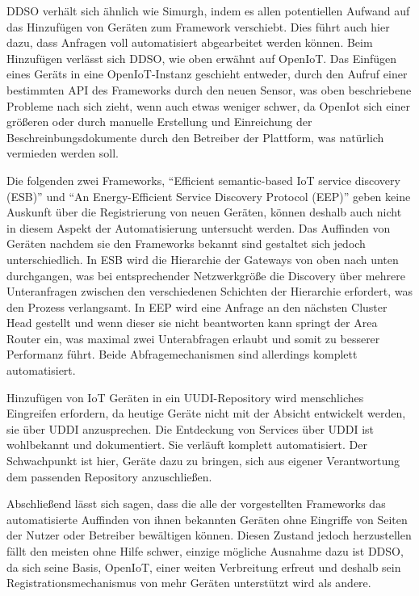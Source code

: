 \documentclass[conference,compsoc]{IEEEtran}
\begin{document}
DDSO verhält sich ähnlich wie Simurgh, indem es allen potentiellen Aufwand auf das Hinzufügen von Geräten zum Framework verschiebt. Dies führt auch hier dazu, dass Anfragen voll automatisiert abgearbeitet werden können. Beim Hinzufügen verlässt sich DDSO, wie oben erwähnt auf OpenIoT. Das Einfügen eines Geräts in eine OpenIoT-Instanz geschieht entweder, durch den Aufruf einer bestimmten API des Frameworks durch den neuen Sensor, was oben beschriebene Probleme nach sich zieht, wenn auch etwas weniger schwer, da OpenIot sich einer größeren  oder durch manuelle Erstellung und Einreichung der Beschreinbungsdokumente durch den Betreiber der Plattform, was natürlich vermieden werden soll.

Die folgenden zwei Frameworks, \enquote{Efficient semantic-based IoT service discovery (ESB)} und \enquote{An Energy-Efficient Service Discovery Protocol (EEP)} geben keine Auskunft über die Registrierung von neuen Geräten, können deshalb auch nicht in diesem Aspekt der Automatisierung untersucht werden. Das Auffinden von Geräten nachdem sie den Frameworks bekannt sind gestaltet sich jedoch unterschiedlich. In ESB wird die Hierarchie der Gateways von oben nach unten durchgangen, was bei entsprechender Netzwerkgröße die Discovery über mehrere Unteranfragen zwischen den verschiedenen Schichten der Hierarchie erfordert, was den Prozess verlangsamt. In EEP wird eine Anfrage an den nächsten Cluster Head gestellt und wenn dieser sie nicht beantworten kann springt der Area Router ein, was maximal zwei Unterabfragen erlaubt und somit zu besserer Performanz führt. Beide Abfragemechanismen sind allerdings komplett automatisiert.

Hinzufügen von IoT Geräten in ein UUDI-Repository wird menschliches Eingreifen erfordern, da heutige Geräte nicht mit der Absicht entwickelt werden, sie über UDDI anzusprechen. Die Entdeckung von Services über UDDI ist wohlbekannt und dokumentiert. Sie verläuft komplett automatisiert. Der Schwachpunkt ist hier, Geräte dazu zu bringen, sich aus eigener Verantwortung dem passenden Repository anzuschließen.

Abschließend lässt sich sagen, dass die alle der vorgestellten Frameworks das automatisierte Auffinden von ihnen bekannten Geräten ohne Eingriffe von Seiten der Nutzer oder Betreiber bewältigen können. Diesen Zustand jedoch herzustellen fällt den meisten ohne Hilfe schwer, einzige mögliche Ausnahme dazu ist DDSO, da sich seine Basis, OpenIoT, einer weiten Verbreitung erfreut und deshalb sein Registrationsmechanismus von mehr Geräten unterstützt wird als andere.
\end{document}

